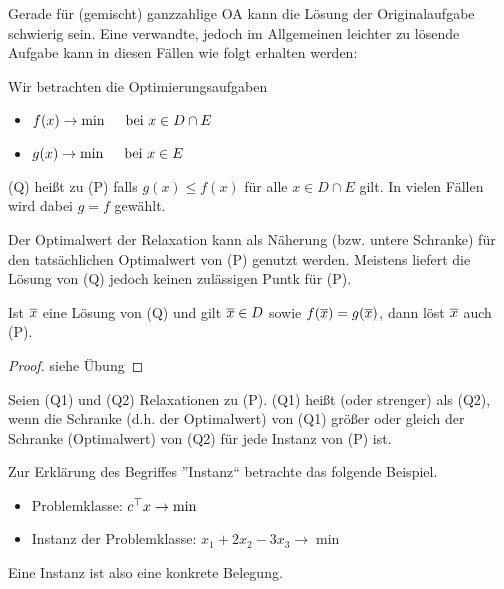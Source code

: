 Gerade für (gemischt) ganzzahlige OA kann die Lösung der Originalaufgabe schwierig sein. Eine verwandte, jedoch im Allgemeinen leichter zu lösende Aufgabe kann  in diesen Fällen wie folgt erhalten werden:

\begin{definition}
	Wir betrachten die Optimierungsaufgaben
	\begin{itemize}[nolistsep, topsep=-\parskip]
		\item[(P)] $f(x) \to \min \quad \text{ bei } x \in D \cap E$
		\item[(Q)] $g(x) \to \min \quad \text{ bei } x \in E$
	\end{itemize}
	(Q) heißt  zu (P) falls $g(x) \le f(x)$ für alle $x \in D \cap E$ gilt. In vielen Fällen wird dabei $g = f$ gewählt.
\end{definition}

Der Optimalwert der Relaxation kann als Näherung (bzw. untere Schranke) für den tatsächlichen Optimalwert von (P) genutzt werden. Meistens liefert die Lösung von (Q) jedoch keinen zulässigen Puntk für (P).

\begin{satz}
	Ist $\overline{x}$ eine Lösung von (Q) und gilt $\overline{x} \in D$ sowie $f(\overline{x}) = g(\overline{x})$, dann löst $\overline{x}$ auch (P).
\end{satz}
\begin{proof}
	siehe Übung
\end{proof}

\begin{definition}
	Seien (Q1) und (Q2) Relaxationen zu (P). (Q1) heißt  (oder strenger) als (Q2), wenn die Schranke (d.h. der Optimalwert) von (Q1) größer oder gleich der Schranke (Optimalwert) von (Q2) für jede Instanz von (P) ist.
\end{definition}

\begin{*anmerkung}
	Zur Erklärung des Begriffes ''Instanz`` betrachte das folgende Beispiel.
	\begin{itemize}[nolistsep, topsep=-\parskip]
		\item Problemklasse: $c^{\top} x \to \min$
		\item Instanz der Problemklasse: $x_1 + 2x_2 - 3x_3 \to \min$
	\end{itemize}
	Eine Instanz ist also eine konkrete Belegung.
\end{*anmerkung}